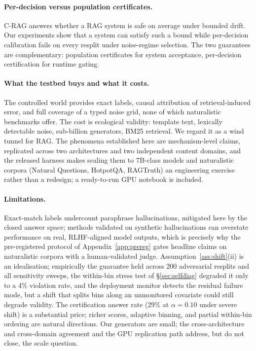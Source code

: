 \documentclass[11pt]{article}
\begin{document}
\paragraph{Per-decision versus population certificates.}
C-RAG \citep{kang2024crag} answers whether a RAG system is safe on
average under bounded drift. Our experiments show that a system can
satisfy such a bound while per-decision calibration fails on every
resplit under noise-regime selection. The two guarantees are
complementary: population certificates for system acceptance,
per-decision certification for runtime gating.

\paragraph{What the testbed buys and what it costs.}
The controlled world provides exact labels, causal attribution of
retrieval-induced error, and full coverage of a typed noise grid, none
of which naturalistic benchmarks offer. The cost is ecological
validity: template text, lexically detectable noise, sub-billion
generators, BM25 retrieval. We regard it as a wind tunnel for RAG. The
phenomena established here are mechanism-level claims, replicated across
two architectures and two independent content domains, and the released
harness makes scaling them to 7B-class models and naturalistic corpora
(Natural Questions, HotpotQA, RAGTruth) an engineering exercise rather
than a redesign; a ready-to-run GPU notebook is included.

\paragraph{Limitations.}
Exact-match labels undercount paraphrase hallucinations, mitigated here
by the closed answer space; methods validated on synthetic hallucinations
can overstate performance on real, RLHF-aligned model outputs, which is
precisely why the
pre-registered protocol of Appendix~\ref{app:prereg} gates headline
claims on naturalistic corpora with a human-validated judge.
Assumption~\ref{ass:shift}(ii) is an idealisation; empirically the
guarantee held across 200 adversarial resplits and all sensitivity
sweeps, the within-bin stress test of \S\ref{sec:selfdiag} degraded it
only to a 4\% violation rate, and the deployment monitor detects the
residual failure mode, but a shift that splits bins along an unmonitored
covariate could still degrade validity. The certification answer rate
(29\% at $\alpha = 0.10$ under severe shift) is a substantial price;
richer scores, adaptive binning, and partial within-bin ordering are
natural directions. Our generators are small; the cross-architecture and
cross-domain agreement and the GPU replication path address, but do not
close, the scale question.
\end{document}
